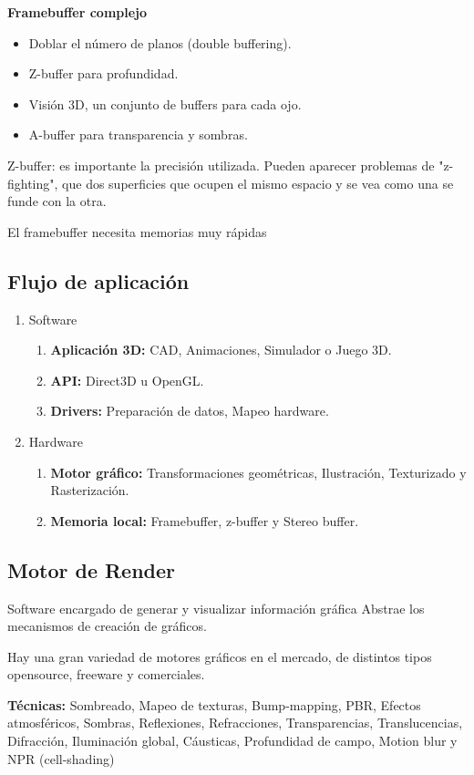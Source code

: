 \textbf{Framebuffer complejo}
\begin{itemize}
	\item Doblar el número de planos (double buffering).
	\item Z-buffer para profundidad.
	\item Visión 3D, un conjunto de buffers para cada ojo.
	\item A-buffer para transparencia y sombras.
\end{itemize}


Z-buffer: es importante la precisión utilizada. Pueden aparecer problemas de "z-fighting", que dos superficies que ocupen el mismo espacio y se vea como una se funde con la otra.

El framebuffer necesita memorias muy rápidas
\pagebreak

\subsection{Flujo de aplicación}\label{subsec:flujo-de-aplicación}
\begin{enumerate}
	\item Software
	      \begin{enumerate}
		      \item \textbf{Aplicación 3D:} CAD, Animaciones, Simulador o Juego 3D\@.
		      \item \textbf{API:} Direct3D u OpenGL\@.
		      \item \textbf{Drivers:} Preparación de datos, Mapeo hardware.
	      \end{enumerate}
	\item Hardware
	      \begin{enumerate}
		      \item \textbf{Motor gráfico:} Transformaciones geométricas, Ilustración, Texturizado y Rasterización.
		      \item \textbf{Memoria local:} Framebuffer, z-buffer y Stereo buffer.
	      \end{enumerate}
\end{enumerate}

\subsection{Motor de Render}\label{subsec:motor-de-render}
Software encargado de generar y visualizar información gráfica Abstrae los mecanismos de creación de gráficos.

Hay una gran variedad de motores gráficos en el mercado, de distintos tipos opensource, freeware y comerciales.

\textbf{Técnicas:} Sombreado, Mapeo de texturas, Bump-mapping, PBR, Efectos atmosféricos, Sombras, Reflexiones, Refracciones, Transparencias, Translucencias, Difracción, Iluminación global, Cáusticas, Profundidad de campo, Motion blur y NPR (cell-shading)